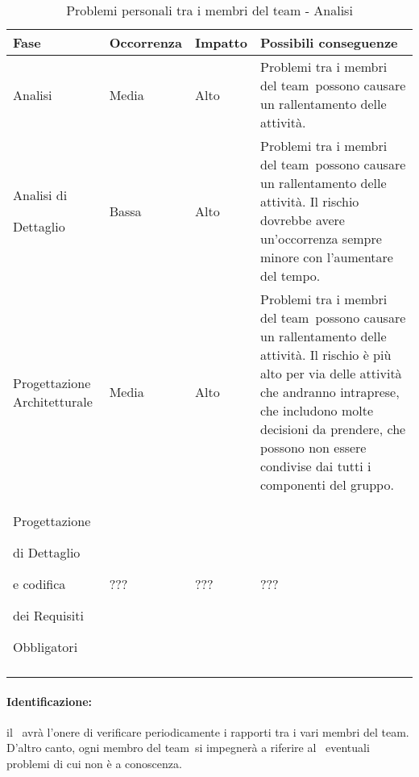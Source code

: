 \documentclass[../PianoProgetto.tex]{subfiles}
\begin{document}
	\hspace{0pt}
		\begin{longtabu} to \textwidth {X[.55] X[c .50] X[c .50] X}
			\toprule
			\textbf{Fase} & \textbf{Occorrenza} & \textbf{Impatto} & \textbf{Possibili conseguenze}\\
			\midrule
			\endhead
			
			Analisi & Media & Alto & Problemi tra i membri del team\g\ possono causare un rallentamento delle attività. \\
			\midrule
			Analisi di \par Dettaglio & Bassa & Alto & Problemi tra i membri del team\g\ possono causare un rallentamento delle attività. Il rischio dovrebbe avere un'occorrenza sempre minore con l'aumentare del tempo. \\
			\midrule
			Progettazione Architetturale & Media & Alto & Problemi tra i membri del team\g\ possono causare un rallentamento delle attività. Il rischio è più alto per via delle attività che andranno intraprese, che includono molte decisioni da prendere, che possono non essere condivise dai tutti i componenti del gruppo. \\
			\midrule
			Progettazione \par di Dettaglio \par e codifica \par dei Requisiti \par Obbligatori & ??? & ??? & ???\\
			\bottomrule
		
		\caption{Problemi personali tra i membri del team - Analisi}
		\label{tab:Problemi personali tra i membri del team - Analisi}	
	\end{longtabu}
	
	\paragraph*{Identificazione:} il \responsabilediprogetto\ avrà l'onere di verificare periodicamente i rapporti tra i vari membri del team\g. D'altro canto, ogni membro del team\g\ si impegnerà a riferire al \responsabilediprogetto\ eventuali problemi di cui non è a conoscenza.
	
\end{document}
